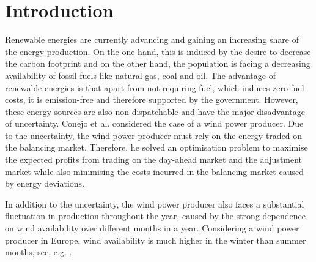 \section{Introduction}

Renewable energies are currently advancing and gaining an increasing share of the energy production. On the one hand, this is induced by the desire to decrease the carbon footprint and on the other hand, the population is facing a decreasing availability of fossil fuels like natural gas, coal and oil. The advantage of renewable energies is that apart from not requiring fuel, which induces zero fuel costs, it is emission-free and therefore supported by the government. However, these energy sources are also non-dispatchable and have the major disadvantage of uncertainty. Conejo et al. \cite{Conejo10} considered the case of a wind power producer. Due to the uncertainty, the wind power producer must rely on the energy traded on the balancing market. Therefore, he solved an optimisation problem to maximise the expected profits from trading on the day-ahead market and the adjustment market while also minimising the costs incurred in the balancing market caused by energy deviations. 

In addition to the uncertainty, the wind power producer also faces a substantial fluctuation in production throughout the year, caused by the strong dependence on wind availability over different months in a year. Considering a wind power producer in Europe, wind availability is much higher in the winter than summer months, see, e.g. \cite{W11}. 

